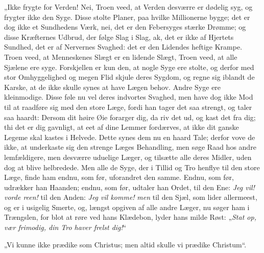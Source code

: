 \documentclass[12pt,a4paper]{book}
\begin{document}
„Ikke frygte for Verden! Nei, Troen veed, at Verden desværre er dødelig syg,
og frygter ikke den Syge. Disse stolte Planer, paa hvilke Millionerne bygge; det
er dog ikke et Sundhedens Værk, nei, det er den Febersyges stærke Drømme; og
disse Kræfternes Udbrud, der følge Slag i Slag, ak, det er ikke af Hjertets
Sundhed, det er af Nervernes Svaghed: det er den Lidendes heftige Krampe. Troen
veed, at Menneskenes Slægt er en lidende Slægt, Troen veed, at alle Sjælene ere
syge. Forskjellen er kun den, at nogle Syge ere stolte, og derfor med stor
Omhyggelighed og megen Flid skjule deres Sygdom, og regne sig iblandt de Karske,
at de ikke skulle synes at have Lægen behov. Andre Syge ere kleinmodige. Disse
føle nu vel deres indvortes Svaghed, men have dog ikke Mod til at raadføre sig
med den store Læge, fordi han tager det saa strengt, og taler saa haardt:
{\large Dersom dit høire Øie forarger dig, da riv det ud, og kast det fra dig;
thi det er dig gavnligt, at eet af dine Lemmer fordærves, at ikke dit ganske
Legeme skal kastes i Helvede.}
Dette synes dem nu en haard Tale; derfor vove de ikke, at underkaste sig den
strenge Læges Behandling, men søge Raad hos andre lemfældigere, men desværre
uduelige Læger, og tilsætte alle deres Midler, uden dog at blive helbredede. Men
alle de Syge,
der i Tillid og Tro henflye til den store Læge, finde ham endnu, som før,
uforandret den samme. Endnu, som før, udrækker han Haanden; endnu, som før,
udtaler han Ordet, til den Ene: \emph{Jeg vil! vorde reen!} til den Anden:
\emph{Jeg vil komme!} \emph{men} til den Sjæl, som lider allermeest, og er i
usigelig Smerte, og, længst opgiven af alle andre Læger, nu søger ham i
Trængslen, for blot at røre ved hans Klædebon, lyder hans milde Røst:
„\emph{Stat op, vær frimodig, din Tro haver frelst dig!}“

„Vi kunne ikke prædike som Christus; men altid skulle vi prædike Christum“.
\end{document}
